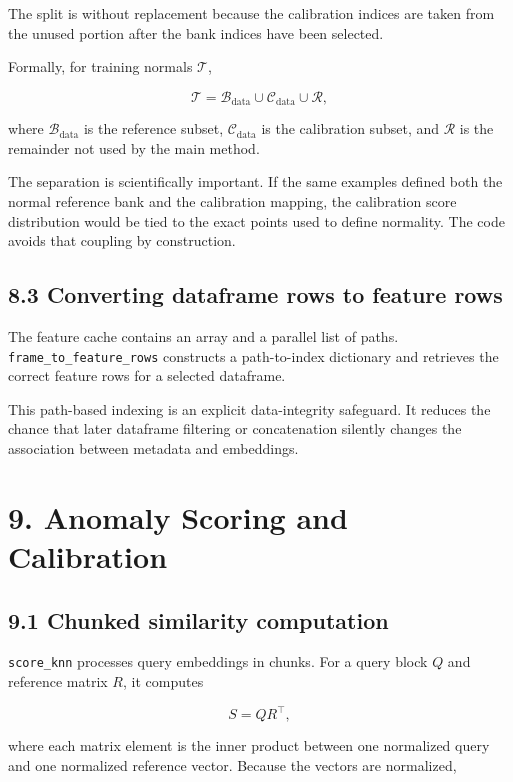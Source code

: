 \documentclass[
  11pt,
]{article}
\begin{document}
The split is without replacement because the calibration indices are
taken from the unused portion after the bank indices have been selected.

Formally, for training normals \(\mathcal{T}\),

\[
\mathcal{T}
=
\mathcal{B}_{\mathrm{data}}
\cup
\mathcal{C}_{\mathrm{data}}
\cup
\mathcal{R},
\]

where \(\mathcal{B}_{\mathrm{data}}\) is the reference subset,
\(\mathcal{C}_{\mathrm{data}}\) is the calibration subset, and
\(\mathcal{R}\) is the remainder not used by the main method.

The separation is scientifically important. If the same examples defined
both the normal reference bank and the calibration mapping, the
calibration score distribution would be tied to the exact points used to
define normality. The code avoids that coupling by construction.

\subsection{8.3 Converting dataframe rows to feature
rows}\label{converting-dataframe-rows-to-feature-rows}

The feature cache contains an array and a parallel list of paths.
\texttt{frame\_to\_feature\_rows} constructs a path-to-index dictionary
and retrieves the correct feature rows for a selected dataframe.

This path-based indexing is an explicit data-integrity safeguard. It
reduces the chance that later dataframe filtering or concatenation
silently changes the association between metadata and embeddings.

\section{9. Anomaly Scoring and
Calibration}\label{anomaly-scoring-and-calibration}

\subsection{9.1 Chunked similarity
computation}\label{chunked-similarity-computation}

\texttt{score\_knn} processes query embeddings in chunks. For a query
block \(Q\) and reference matrix \(R\), it computes

\[
S=QR^\top,
\]

where each matrix element is the inner product between one normalized
query and one normalized reference vector. Because the vectors are
normalized,
\end{document}
